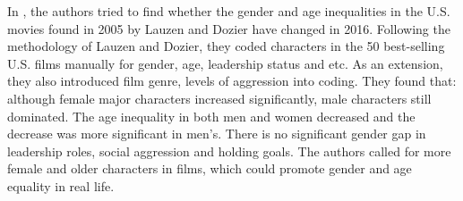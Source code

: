 \documentclass[11pt,a4paper]{article}
\begin{document}
In \cite{Neville2018FewerFilms}, the authors tried to find whether the gender and age inequalities in the U.S. movies found in 2005 by Lauzen and Dozier have changed in 2016.  Following the methodology of Lauzen and Dozier, they coded characters in the 50 best-selling U.S. films manually for gender, age, leadership status and etc. As an extension, they also introduced film genre, levels of aggression into coding. They found that: although female major characters increased significantly, male characters still dominated. The age inequality in both men and women decreased and the decrease was more significant in men’s. There is no significant gender gap in leadership roles, social aggression and holding goals. The authors called for more female and older characters in films, which could promote gender and age equality in real life.\\
\end{document}
